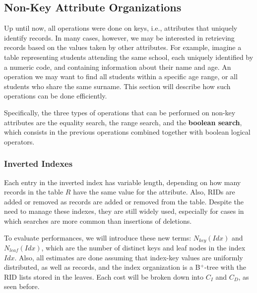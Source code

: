 \subsection{Non-Key Attribute Organizations}

Up until now, all operations were done on keys, i.e., attributes that uniquely identify records. In many cases, however, we may be interested in retrieving records based on the values taken by other attributes. For example, imagine a table representing students attending the same school, each uniquely identified by a numeric code, and containing information about their name and age. An operation we may want to find all students within a specific age range, or all students who share the same surname. This section will describe how such operations can be done efficiently.

Specifically, the three types of operations that can be performed on non-key attributes are the equality search, the range search, and the \textbf{boolean search}, which consists in the previous operations combined together with boolean logical operators.


\subsubsection{Inverted Indexes}


Each entry in the inverted index has variable length, depending on how many records in the table $R$ have the same value for the attribute. Also, RIDs are added or removed as records are added or removed from the table. Despite the need to manage these indexes, they are still widely used, especially for cases in which searches are more common than insertions of deletions.

To evaluate performances, we will introduce these new terms: $N_{key}(Idx)$ and $N_{leaf}(Idx)$, which are the number of distinct keys and leaf nodes in the index $Idx$. Also, all estimates are done assuming that index-key values are uniformly distributed, as well as records, and the index organization is a B$^+$-tree with the RID lists stored in the leaves. Each cost will be broken down into $C_I$ and $C_D$, as seen before.

